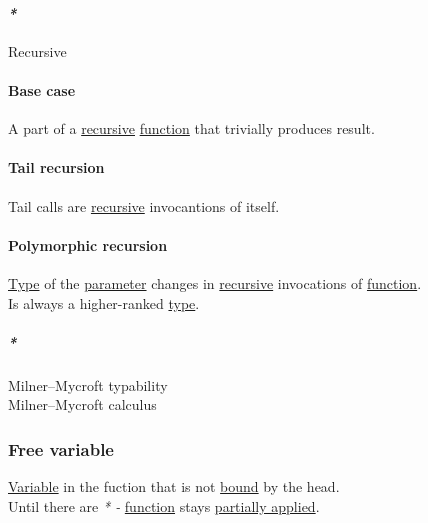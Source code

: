 \documentclass[11pt]{article}
\begin{document}
\paragraph{\emph{*}}
\label{sec:org1b7d764}

\label{orgf513e66}Recursive\\

\paragraph{\label{org5e6db3a}Base case}
\label{sec:org7dec5f5}
A part of a \hyperref[orgf513e66]{recursive} \hyperref[orge15bc14]{function} that trivially produces result.\\

\paragraph{\label{orgc86d27f}Tail recursion}
\label{sec:org79a27af}
Tail calls are \hyperref[orgf513e66]{recursive} invocantions of itself.\\

\paragraph{\label{org31474b8}Polymorphic recursion}
\label{sec:org6a09703}
\hyperref[orgc4aea2f]{Type} of the \hyperref[org0e7674e]{parameter} changes in \hyperref[orgf513e66]{recursive} invocations of \hyperref[orge15bc14]{function}.\\

Is always a higher-ranked \hyperref[orgc4aea2f]{type}.\\

\subparagraph{\emph{*}}
\label{sec:org58661be}

\label{org60aeb86}Milner–Mycroft typability\\
\label{orgecc9717}Milner–Mycroft calculus\\

\subsubsection{\label{org6a6e158}Free variable}
\label{sec:orgd9e055b}
\hyperref[org0b57594]{Variable} in the fuction that is not \hyperref[orgaac83d9]{bound} by the head.\\
Until there are \emph{* -} \hyperref[orge15bc14]{function} stays \hyperref[org23a90a6]{partially applied}.\\
\end{document}

